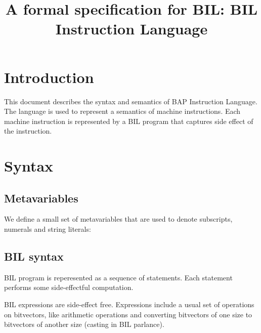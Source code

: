 \documentclass[11pt]{article}
\begin{document}


\title{A formal specification for BIL: BIL Instruction Language}
\maketitle

\tableofcontents
\clearpage

\section{Introduction}
\label{sec:intro}

This document describes the syntax and semantics of BAP Instruction
Language.  The language is used to represent a semantics of machine
instructions. Each machine instruction is represented by a BIL program
that captures side effect of the instruction.

\section{Syntax}
\label{sec:syntax}

\subsection{Metavariables}
\label{sec:meta}

We define a small set of metavariables that are used to denote
subscripts, numerals and string literals:

\ottmetavars

\subsection{BIL syntax}

BIL program is reperesented as a sequence of statements. Each
statement performs some side-effectful computation.

\ottgrammartabular{
\ottbil\ottinterrule
}

\ottgrammartabular{
\ottstmt\ottinterrule
}

BIL expressions are side-effect free. Expressions include a usual set
of operations on bitvectors, like arithmetic operations and converting
bitvectors of one size to bitvectors of another size (casting in BIL
parlance).

\ottgrammartabular{
\ottexp\ottinterrule
}

\ottgrammartabular{
\ottvar\ottinterrule
}

\ottgrammartabular{
\ottbop\ottinterrule
\ottuop\ottinterrule
\ottendian\ottinterrule
\ottcast\ottinterrule
}
\end{document}
